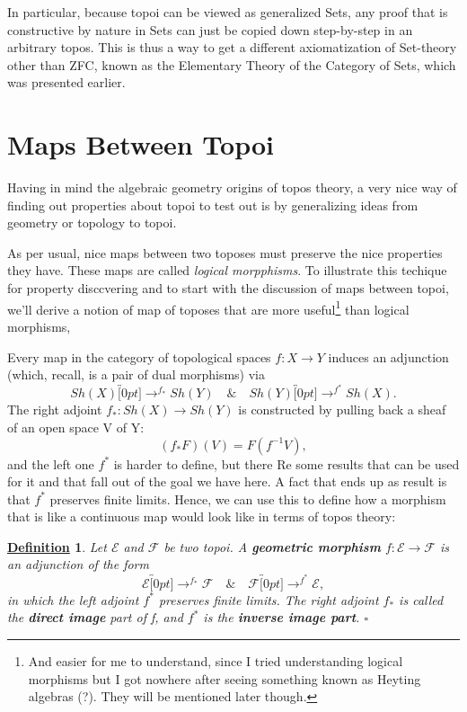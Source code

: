 \documentclass{article}
\newtheorem*{def*}{\underline{Definition}}
\begin{document}
In particular, because topoi can be viewed as generalized Sets, any proof that is constructive by nature in Sets can just be copied down step-by-step in an arbitrary topos. This is thus a way to get a different axiomatization of Set-theory other than ZFC, known as the Elementary Theory of the Category of Sets, which was presented earlier.

\section{Maps Between Topoi}

Having in mind the algebraic geometry origins of topos theory, a very nice way of finding out properties about topoi to test out is by generalizing ideas from geometry or topology to topoi.

As per usual, nice maps between two toposes must preserve the nice properties they have. These maps are called \textit{logical morpphisms}. To illustrate this techique for property disccvering and to start with the discussion of maps between topoi, we'll derive a notion of map of toposes that are more useful\footnote{And easier for me to understand, since I tried understanding logical morphisms but I got nowhere after seeing something known as Heyting algebras (?). They will be mentioned later though.} than logical morphisms,

Every map in the category of topological spaces \(f:X\rightarrow Y\) induces an adjunction (which, recall, is a pair of dual morphisms) via
\[
	Sh(X)\overbracket[0pt]{\rightarrow}^{f_{*}}Sh(Y) \quad\&\quad Sh(Y)\overbracket[0pt]{\rightarrow}^{f^{*}}Sh(X).
\]
The right adjoint \(f_{*}:Sh(X)\rightarrow Sh(Y)\) is constructed by pulling back a sheaf of an open space V of Y:
\[
	(f_{*}F)(V) = F(f^{-1}V),
\]
and the left one \(f^*\) is harder to define, but there Re some results that can be used for it and that fall out of the goal we have here. A fact that ends up as result is that \(f ^{*}\) preserves finite limits. Hence, we can use this to define how a morphism that is like a continuous map would look like in terms of topos theory:

\begin{def*}
	Let \(\mathcal{E}\) and \(\mathcal{F}\) be two topoi. A \textbf{geometric morphism} \(f:\mathcal{E}\rightarrow \mathcal{F}\) is an adjunction of the form
	\[
		\mathcal{E}\overbracket[0pt]{\rightarrow}^{f_{*}}\mathcal{F} \quad\&\quad \mathcal{F}\overbracket[0pt]{\rightarrow}^{f^{*}}\mathcal{E},
	\]
	in which the left adjoint \(f ^{*}\) preserves finite limits. The right adjoint \(f_{*}\) is called the \textbf{direct image} part of f, and \(f^{*}\) is the \textbf{inverse image part}. \(\square\)
\end{def*}
\end{document}
